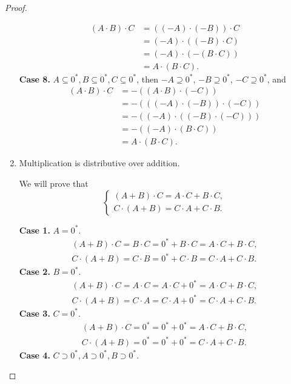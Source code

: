 \begin{proof}
\begin{enumerate}[label={(F\arabic*)}, start=4]
\begin{align*}
                  (A\cdot B)\cdot C & = ((-A)\cdot (-B))\cdot C \\
                                    & = (-A)\cdot ((-B)\cdot C) \\
                                    & = (-A)\cdot (-(B\cdot C)) \\
                                    & = A\cdot (B\cdot C).
              \end{align*}
              \textbf{Case 8.} $A\subseteq {0}^{*}, B\subseteq {0}^{*}, C\subseteq {0}^{*}$, then $-A\supseteq {0}^{*}$, $-B\supseteq {0}^{*}$, $-C\supseteq {0}^{*}$, and
              \begin{align*}
                  (A\cdot B)\cdot C & = -((A\cdot B)\cdot (-C))       \\
                                    & = -(((-A)\cdot (-B))\cdot (-C)) \\
                                    & = -((-A)\cdot ((-B)\cdot (-C))) \\
                                    & = -((-A)\cdot (B\cdot C))       \\
                                    & = A\cdot (B\cdot C).
              \end{align*}
        \item Multiplication is distributive over addition.

              We will prove that
              \[
                  \begin{cases}
                      (A + B)\cdot C = A\cdot C + B\cdot C, \\
                      C\cdot (A + B) = C\cdot A + C\cdot B.
                  \end{cases}
              \]

              \textbf{Case 1.} $A = {0}^{*}$.
              \[
                  \begin{split}
                      (A + B)\cdot C = B\cdot C = {0}^{*} + B\cdot C = A\cdot C + B\cdot C, \\
                      C\cdot (A + B) = C\cdot B = {0}^{*} + C\cdot B = C\cdot A + C\cdot B.
                  \end{split}
              \]
              \textbf{Case 2.} $B = {0}^{*}$.
              \[
                  \begin{split}
                      (A + B)\cdot C = A\cdot C = A\cdot C + {0}^{*} = A\cdot C + B\cdot C, \\
                      C\cdot (A + B) = C\cdot A = C\cdot A + {0}^{*} = C\cdot A + C\cdot B.
                  \end{split}
              \]
              \textbf{Case 3.} $C = {0}^{*}$.
              \[
                  \begin{split}
                      (A + B)\cdot C = {0}^{*} = {0}^{*} + {0}^{*} = A\cdot C + B\cdot C, \\
                      C\cdot (A + B) = {0}^{*} = {0}^{*} + {0}^{*} = C\cdot A + C\cdot B.
                  \end{split}
              \]
              \textbf{Case 4.} $C\supset {0}^{*}, A\supset {0}^{*}, B\supset {0}^{*}$.


\end{enumerate}
\end{proof}
